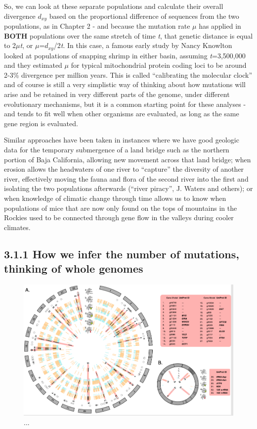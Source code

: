 \documentclass[
]{article}
\begin{document}
So, we can look at these separate populations and calculate their
overall divergence \(d_{xy}\) based on the proportional difference of
sequences from the two populations, as in Chapter 2 - and because the
mutation rate \(\mu\) has applied in \textbf{BOTH} populations over the
same stretch of time \emph{t}, that genetic distance is equal to
2\(\mu\)\emph{t}, or \(\mu\)=\(d_{xy}\)/2\emph{t}. In this case, a
famous early study by Nancy Knowlton looked at populations of snapping
shrimp in either basin, assuming \emph{t}=3,500,000 and they estimated
\(\mu\) for typical mitochondrial protein coding loci to be around 2-3\%
divergence per million years. This is called ``calibrating the molecular
clock'' and of course is still a very simplistic way of thinking about
how mutations will arise and be retained in very different parts of the
genome, under different evolutionary mechanisms, but it is a common
starting point for these analyses - and tends to fit well when other
organisms are evaluated, as long as the same gene region is evaluated.

Similar approaches have been taken in instances where we have good
geologic data for the temporary submergence of a land bridge such as the
northern portion of Baja California, allowing new movement across that
land bridge; when erosion allows the headwaters of one river to
``capture'' the diversity of another river, effectively moving the fauna
and flora of the second river into the first and isolating the two
populations afterwards (``river piracy'', J. Waters and others); or when
knowledge of climatic change through time allows us to know when
populations of mice that are now only found on the tops of mountains in
the Rockies used to be connected through gene flow in the valleys during
cooler climates.

\hypertarget{how-we-infer-the-number-of-mutations-thinking-of-whole-genomes}{%
\subsection{3.1.1 How we infer the number of mutations, thinking of
whole
genomes}\label{how-we-infer-the-number-of-mutations-thinking-of-whole-genomes}}

\begin{figure}

{\centering \includegraphics[width=0.9\linewidth]{MEImages/Pisgenome} 

}

\caption{...}\label{fig:unnamed-chunk-3}
\end{figure}
\end{document}

